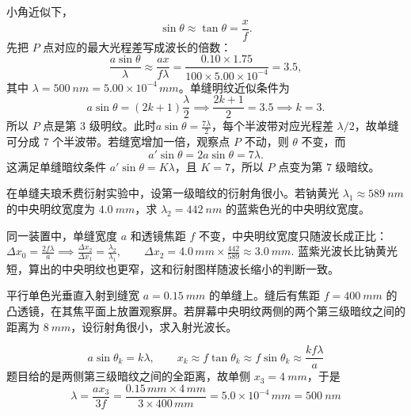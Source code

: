 \begin{solution}
小角近似下，
\[
\sin\theta\approx\tan\theta=\frac{x}{f}.
\]
先把 \(P\) 点对应的最大光程差写成波长的倍数：
\[
\frac{a\sin\theta}{\lambda}\approx\frac{ax}{f\lambda}
=\frac{0.10\times1.75}{100\times 5.00\times10^{-4}}=3.5,
\]
其中 \(\lambda=\SI{500}{nm}=5.00\times10^{-4}\,\si{mm}\)。单缝明纹近似条件为
\[
a\sin\theta=(2k+1)\frac{\lambda}{2}\implies\frac{2k+1}{2}=3.5\implies k=3.
\]
所以 \(P\) 点是第 \(3\) 级明纹。此时$a\sin\theta=\frac{7\lambda}{2}$，每个半波带对应光程差 \(\lambda/2\)，故单缝可分成 \(7\) 个半波带。若缝宽增加一倍，观察点 \(P\) 不动，则 \(\theta\) 不变，而
\[
a'\sin\theta=2a\sin\theta=7\lambda.
\]
这满足单缝暗纹条件 \(a'\sin\theta=K\lambda\)，且 \(K=7\)，所以 \(P\) 点变为第 \(7\) 级暗纹。
\end{solution}


\begin{exercise}
在单缝夫琅禾费衍射实验中，设第一级暗纹的衍射角很小。若钠黄光 \(\lambda_1\approx\SI{589}{nm}\) 的中央明纹宽度为 \(\SI{4.0}{mm}\)，求 \(\lambda_2=\SI{442}{nm}\) 的蓝紫色光的中央明纹宽度。
\end{exercise}

\begin{solution}
同一装置中，单缝宽度 \(a\) 和透镜焦距 \(f\) 不变，中央明纹宽度只随波长成正比：
 \(\Delta x_0=\frac{2f\lambda}{a} \implies \frac{\Delta x_2}{\Delta x_1}=\frac{\lambda_2}{\lambda_1},\qquad \Delta x_2 =4.0\,\si{mm}\times\frac{442}{589} \approx \SI{3.0}{mm}.\) 
蓝紫光波长比钠黄光短，算出的中央明纹也更窄，这和衍射图样随波长缩小的判断一致。
\end{solution}

\begin{exercise}
平行单色光垂直入射到缝宽 \(a=\SI{0.15}{mm}\) 的单缝上。缝后有焦距 \(f=\SI{400}{mm}\) 的凸透镜，在其焦平面上放置观察屏。若屏幕中央明纹两侧的两个第三级暗纹之间的距离为 \(\SI{8}{mm}\)，设衍射角很小，求入射光波长。
\end{exercise}
\begin{solution}
 \[a\sin\theta_k=k\lambda,\qquad x_k\approx f\tan\theta_k\approx f\sin\theta_k\approx\frac{kf\lambda}{a}\] 
题目给的是两侧第三级暗纹之间的全距离，故单侧 \(x_3=\SI{4}{mm}\)，于是
 \[\lambda=\frac{a x_3}{3f} =\frac{0.15\,\si{mm}\times 4\,\si{mm}}{3\times 400\,\si{mm}} =5.0\times10^{-4}\,\si{mm} =\SI{500}{nm}\]
\end{solution}
